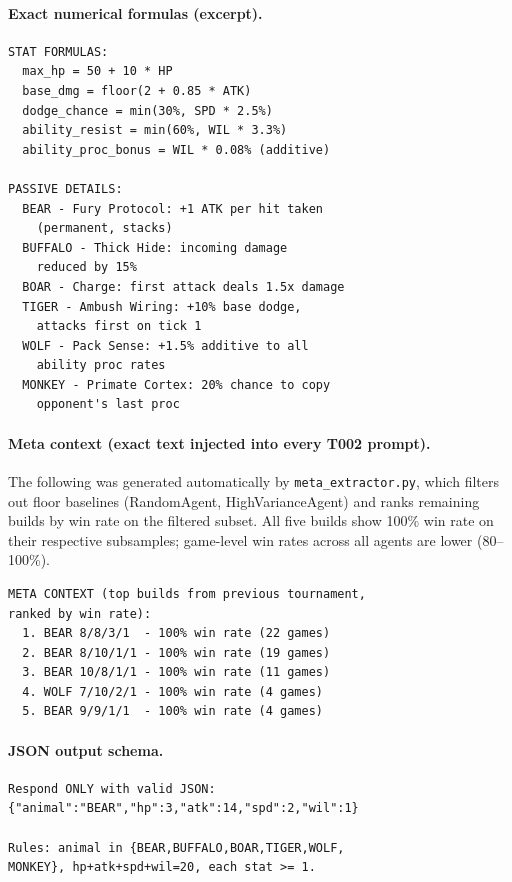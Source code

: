 \documentclass[11pt]{article}
\newcommand{\tTwo}{T002}
\begin{document}
\paragraph{Exact numerical formulas (excerpt).}
\begingroup
\small
\begin{verbatim}
STAT FORMULAS:
  max_hp = 50 + 10 * HP
  base_dmg = floor(2 + 0.85 * ATK)
  dodge_chance = min(30%, SPD * 2.5%)
  ability_resist = min(60%, WIL * 3.3%)
  ability_proc_bonus = WIL * 0.08% (additive)

PASSIVE DETAILS:
  BEAR - Fury Protocol: +1 ATK per hit taken
    (permanent, stacks)
  BUFFALO - Thick Hide: incoming damage
    reduced by 15%
  BOAR - Charge: first attack deals 1.5x damage
  TIGER - Ambush Wiring: +10% base dodge,
    attacks first on tick 1
  WOLF - Pack Sense: +1.5% additive to all
    ability proc rates
  MONKEY - Primate Cortex: 20% chance to copy
    opponent's last proc
\end{verbatim}
\endgroup

\paragraph{Meta context (exact text injected into every \tTwo{} prompt).}
The following was generated automatically by \texttt{meta\_extractor.py}, which filters out floor baselines (RandomAgent, HighVarianceAgent) and ranks remaining builds by win rate on the filtered subset.
All five builds show 100\% win rate on their respective subsamples; game-level win rates across all agents are lower (80--100\%).

\begingroup
\small
\begin{verbatim}
META CONTEXT (top builds from previous tournament,
ranked by win rate):
  1. BEAR 8/8/3/1  - 100% win rate (22 games)
  2. BEAR 8/10/1/1 - 100% win rate (19 games)
  3. BEAR 10/8/1/1 - 100% win rate (11 games)
  4. WOLF 7/10/2/1 - 100% win rate (4 games)
  5. BEAR 9/9/1/1  - 100% win rate (4 games)
\end{verbatim}
\endgroup

\paragraph{JSON output schema.}
\begingroup
\small
\begin{verbatim}
Respond ONLY with valid JSON:
{"animal":"BEAR","hp":3,"atk":14,"spd":2,"wil":1}

Rules: animal in {BEAR,BUFFALO,BOAR,TIGER,WOLF,
MONKEY}, hp+atk+spd+wil=20, each stat >= 1.
\end{verbatim}
\endgroup
\end{document}

